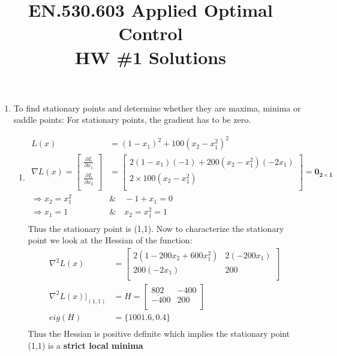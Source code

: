 
\title{EN.530.603 Applied Optimal Control \\HW \#1 Solutions}
\graphicspath{{./figures/}}

\maketitle

\begin{enumerate}

\item To find stationary points and determine whether they are maxima, minima or
saddle points:
  For stationary points, the gradient has to be zero.
  \begin{enumerate}
   \item  %
   \begin{align*}
      L(x) &= (1-x_1)^2 + 100(x_2 - x_1^2)^2 \\[6pt]
      \nabla L(x) = \begin{bmatrix}
			  \frac{\partial L}{\partial x_1} \\[6pt]
			  \frac{\partial L}{\partial x_2} \\
			  \end{bmatrix}  &= 
			  \begin{bmatrix}
			    2(1-x_1)(-1) + 200(x_2 - x_1^2)(-2x_1) \\
			    2\times 100 (x_2 -x_1^2)\\
			    \end{bmatrix}  = \mathbf{0_{2\times1}}\\[6pt]
	\Rightarrow x_2 = x_1^2 \quad &	\& \quad -1+x_1 = 0\\
	\Rightarrow x_1 = 1 \quad & \& \quad x_2 = x_1^2 = 1 \\
   \end{align*}
   Thus the stationary point is (1,1). Now to characterize the stationary point
we look at the Hessian of the function:
   \begin{align*}
    \nabla^2 L(x) &= \begin{bmatrix}
                     2\left( 1 - 200 x_2 + 600 x_1^2\right) & 2 (-200 x_1) \\
                     200(-2 x_1) & 200 \\
                    \end{bmatrix}\\[6pt]
     \nabla^2 L(x) |_{(1,1)} &= H =  \begin{bmatrix}
                                802 & -400 \\
                                -400 & 200 \\
                               \end{bmatrix}\\
      eig(H) &= \{1001.6, 0.4\}\\
   \end{align*}
   Thus the Hessian is positive definite which implies the stationary point
(1,1) is a \textbf{strict local minima}
   

\end{enumerate}
\end{enumerate}
